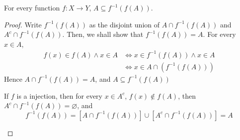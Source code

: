 \documentclass[../../main.tex]{subfiles}
\begin{document}
    \begin{lemma}
        For every function $f: X\to Y$, $A\subseteq f^{-1}(f(A))$.
    \end{lemma}
    \begin{proof}
        Write $f^{-1}\left(f(A)\right)$ as the disjoint union of $A\cap f^{-1}\left(f(A)\right)$ and $A^c\cap f^{-1}\left(f(A)\right)$. Then, we shall show that $f^{-1}\left(f(A)\right) = A$. For every $x\in A$,
        \begin{align*}
            f(x)\in f(A)\wedge x\in A&\iff x\in f^{-1}(f(A))\wedge x\in A\\
            &\iff x\in A\cap \left(f^{-1}(f(A))\right)
        \end{align*}
        Hence $A\cap f^{-1}\left(f(A)\right)=A$, and $A\subseteq f^{-1}\left(f(A)\right)$
        \begin{remark}
            If $f$ is a injection, then for every $x\in A^c$, $f(x)\notin f(A)$, then $A^c\cap f^{-1}\left(f(A)\right)=\varnothing$, and
            \[
            f^{-1}\left(f(A)\right) = \left[A\cap f^{-1}\left(f(A)\right)\right] \cup \left[A^c\cap f^{-1}\left(f(A)\right)\right] = A
            \]
        \end{remark}
    \end{proof}
\end{document}
